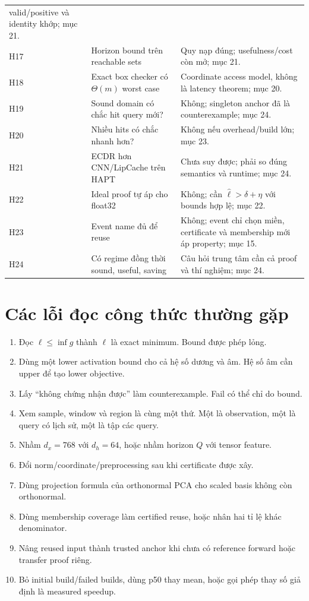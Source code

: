 \documentclass[11pt,a4paper]{article}
\theoremstyle{definition}
\begin{document}
\begin{longtable}{@{}p{0.85cm}p{6.9cm}p{5.8cm}@{}}
valid/positive và identity khớp; mục 21.\\
H17 & Horizon bound trên reachable sets & Quy nạp đúng; usefulness/cost
còn mở; mục 21.\\
H18 & Exact box checker có $\Theta(m)$ worst case & Coordinate access model,
không là latency theorem; mục 20.\\
H19 & Sound domain có chắc hit query mới? & Không; singleton anchor đã là
counterexample; mục 24.\\
H20 & Nhiều hits có chắc nhanh hơn? & Không nếu overhead/build lớn;
mục 23.\\
H21 & ECDR hơn CNN/LipCache trên HAPT & Chưa suy được; phải so đúng semantics
và runtime; mục 24.\\
H22 & Ideal proof tự áp cho float32 & Không; cần $\widehat\ell>\delta+\eta$
với bounds hợp lệ; mục 22.\\
H23 & Event name đủ để reuse & Không; event chỉ chọn miền, certificate và
membership mới áp property; mục 15.\\
H24 & Có regime đồng thời sound, useful, saving & Câu hỏi trung tâm cần
cả proof và thí nghiệm; mục 24.\\\bottomrule
\end{longtable}

\section{Các lỗi đọc công thức thường gặp}
\begin{enumerate}
\item Đọc $\ell\le\inf g$ thành $\ell$ là exact minimum. Bound được phép lỏng.
\item Dùng một lower activation bound cho cả hệ số dương và âm. Hệ số âm
cần upper để tạo lower objective.
\item Lấy ``không chứng nhận được'' làm counterexample. Fail có thể chỉ do bound.
\item Xem sample, window và region là cùng một thứ. Một là observation,
một là query có lịch sử, một là tập các query.
\item Nhầm $d_x=768$ với $d_h=64$, hoặc nhầm horizon $Q$ với tensor feature.
\item Đổi norm/coordinate/preprocessing sau khi certificate được xây.
\item Dùng projection formula của orthonormal PCA cho scaled basis không
còn orthonormal.
\item Dùng membership coverage làm certified reuse, hoặc nhân hai tỉ lệ
khác denominator.
\item Nâng reused input thành trusted anchor khi chưa có reference forward
hoặc transfer proof riêng.
\item Bỏ initial build/failed builds, dùng p50 thay mean, hoặc gọi phép thay
số giả định là measured speedup.
\end{enumerate}
\end{document}
